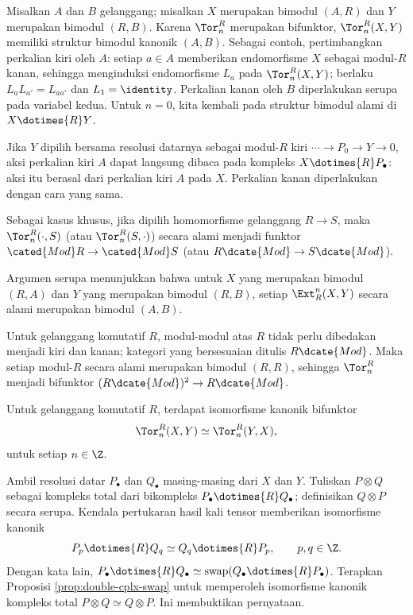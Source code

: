 \begin{catatan}\label{rem:ExtTor-bimodule}
Misalkan $A$ dan $B$ gelanggang; misalkan $X$ merupakan bimodul $(A,R)$ dan
$Y$ merupakan bimodul $(R,B)$. Karena $\Tor_n^R$ merupakan bifunktor,
$\Tor_n^R(X,Y)$ memiliki struktur bimodul kanonik $(A,B)$. Sebagai contoh,
pertimbangkan perkalian kiri oleh $A$: setiap $a\in A$ memberikan endomorfisme
$X$ sebagai modul-$R$ kanan, sehingga menginduksi endomorfisme
$L_a$ pada $\Tor_n^R(X,Y)$; berlaku $L_aL_{a'}=L_{aa'}$ dan
$L_1=\identity$. Perkalian kanan oleh $B$ diperlakukan serupa pada variabel
kedua. Untuk $n=0$, kita kembali pada struktur bimodul alami di
$X\dotimes{R}Y$.

Jika $Y$ dipilih bersama resolusi datarnya sebagai modul-$R$ kiri
$\cdots\to P_0\to Y\to0$, aksi perkalian kiri $A$ dapat langsung dibaca pada
kompleks $X\dotimes{R}P_\bullet$: aksi itu berasal dari perkalian kiri $A$
pada $X$. Perkalian kanan diperlakukan dengan cara yang sama.

Sebagai kasus khusus, jika dipilih homomorfisme gelanggang $R\to S$, maka
$\Tor_n^R(\cdot,S)$ (atau $\Tor_n^R(S,\cdot)$) secara alami menjadi funktor
$\cated{Mod}R\to\cated{Mod}S$ (atau $R\dcate{Mod}\to S\dcate{Mod}$).

Argumen serupa menunjukkan bahwa untuk $X$ yang merupakan bimodul $(R,A)$ dan
$Y$ yang merupakan bimodul $(R,B)$, setiap $\Ext_R^n(X,Y)$ secara alami
merupakan bimodul $(A,B)$.
\end{catatan}

Untuk gelanggang komutatif $R$, modul-modul atas $R$ tidak perlu dibedakan
menjadi kiri dan kanan; kategori yang bersesuaian ditulis $R\dcate{Mod}$. Maka
setiap modul-$R$ secara alami merupakan bimodul $(R,R)$, sehingga $\Tor_n^R$
menjadi bifunktor $(R\dcate{Mod})^2\to R\dcate{Mod}$.

\begin{proposisi}\label{prop:Tor-symmetry}
Untuk gelanggang komutatif $R$, terdapat isomorfisme kanonik bifunktor
\[
\Tor_n^R(X,Y)\simeq\Tor_n^R(Y,X),
\]
untuk setiap $n\in\Z$.
\end{proposisi}

\begin{bukti}
Ambil resolusi datar $P_\bullet$ dan $Q_\bullet$ masing-masing dari $X$ dan
$Y$. Tuliskan $P\otimes Q$ sebagai kompleks total dari bikompleks
$P_\bullet\dotimes{R}Q_\bullet$; definisikan $Q\otimes P$ secara serupa.
Kendala pertukaran hasil kali tensor \cite[Proposisi 6.5.14]{Li1} memberikan
isomorfisme kanonik
\[
P_p\dotimes{R}Q_q\simeq Q_q\dotimes{R}P_p,\qquad p,q\in\Z.
\]
Dengan kata lain,
$P_\bullet\dotimes{R}Q_\bullet\simeq
\mathrm{swap}(Q_\bullet\dotimes{R}P_\bullet)$. Terapkan Proposisi
\ref{prop:double-cplx-swap} untuk memperoleh isomorfisme kanonik kompleks
total $P\otimes Q\simeq Q\otimes P$. Ini membuktikan pernyataan.
\end{bukti}

